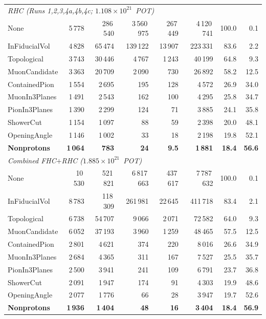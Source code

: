\documentclass[11pt,a4paper]{article}
\begin{document}
\begin{table}[H]
\begin{tabular}{lrrrrrrr}
    \midrule
    \multicolumn{8}{l}{\textit{RHC (Runs 1,2,3,4a,4b,4c; $1.108\times10^{21}$~POT)}} \\
    None & 5\,778 & 286\,540 & 3\,560\,975 & 267\,449 & 4\,120\,741 & 100.0 & 0.1 \\
    InFiducialVol & 4\,828 & 65\,474 & 139\,122 & 13\,907 & 223\,331 & 83.6 & 2.2 \\
    Topological & 3\,743 & 30\,446 & 4\,767 & 1\,243 & 40\,199 & 64.8 & 9.3 \\
    MuonCandidate & 3\,363 & 20\,709 & 2\,090 & 730 & 26\,892 & 58.2 & 12.5 \\
    ContainedPion & 1\,554 & 2\,695 & 195 & 128 & 4\,572 & 26.9 & 34.0 \\
    MuonIn3Planes & 1\,491 & 2\,543 & 162 & 100 & 4\,295 & 25.8 & 34.7 \\
    PionIn3Planes & 1\,390 & 2\,299 & 124 & 71 & 3\,885 & 24.1 & 35.8 \\
    ShowerCut & 1\,154 & 1\,097 & 88 & 59 & 2\,398 & 20.0 & 48.1 \\
    OpeningAngle & 1\,146 & 1\,002 & 33 & 18 & 2\,198 & 19.8 & 52.1 \\
    \textbf{Nonprotons} & \textbf{1\,064} & \textbf{783} & \textbf{24} & \textbf{9.5} & \textbf{1\,881} & \textbf{18.4} & \textbf{56.6} \\
    \midrule
    \multicolumn{8}{l}{\textit{Combined FHC$+$RHC ($1.885\times10^{21}$~POT)}} \\
    None & 10\,530 & 521\,821 & 6\,817\,663 & 437\,617 & 7\,787\,632 & 100.0 & 0.1 \\
    InFiducialVol & 8\,783 & 118\,309 & 261\,981 & 22\,645 & 411\,718 & 83.4 & 2.1 \\
    Topological & 6\,738 & 54\,707 & 9\,066 & 2\,071 & 72\,582 & 64.0 & 9.3 \\
    MuonCandidate & 6\,052 & 37\,193 & 3\,960 & 1\,259 & 48\,465 & 57.5 & 12.5 \\
    ContainedPion & 2\,801 & 4\,621 & 374 & 220 & 8\,016 & 26.6 & 34.9 \\
    MuonIn3Planes & 2\,684 & 4\,365 & 311 & 167 & 7\,527 & 25.5 & 35.7 \\
    PionIn3Planes & 2\,500 & 3\,941 & 241 & 109 & 6\,791 & 23.7 & 36.8 \\
    ShowerCut & 2\,091 & 1\,947 & 174 & 91 & 4\,303 & 19.9 & 48.6 \\
    OpeningAngle & 2\,077 & 1\,776 & 66 & 28 & 3\,947 & 19.7 & 52.6 \\
    \textbf{Nonprotons} & \textbf{1\,936} & \textbf{1\,404} & \textbf{48} & \textbf{16} & \textbf{3\,404} & \textbf{18.4} & \textbf{56.9} \\
    \bottomrule
  \end{tabular}
\end{table}
\end{document}
